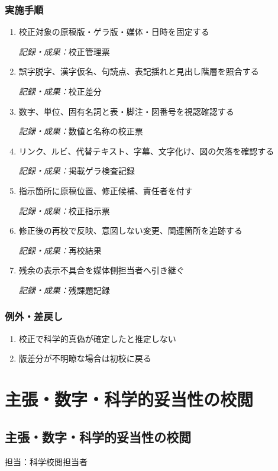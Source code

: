 \documentclass[a4paper,11pt]{article}
\begin{document}
\subsubsection*{実施手順}
\begin{enumerate}[leftmargin=2em,itemsep=0.65em]
\item 校正対象の原稿版・ゲラ版・媒体・日時を固定する\par\noindent\textit{記録・成果：}校正管理票\nobreak\smallskip
\item 誤字脱字、漢字仮名、句読点、表記揺れと見出し階層を照合する\par\noindent\textit{記録・成果：}校正差分\nobreak\smallskip
\item 数字、単位、固有名詞と表・脚注・図番号を視認確認する\par\noindent\textit{記録・成果：}数値と名称の校正票\nobreak\smallskip
\item リンク、ルビ、代替テキスト、字幕、文字化け、図の欠落を確認する\par\noindent\textit{記録・成果：}掲載ゲラ検査記録\nobreak\smallskip
\item 指示箇所に原稿位置、修正候補、責任者を付す\par\noindent\textit{記録・成果：}校正指示票\nobreak\smallskip
\item 修正後の再校で反映、意図しない変更、関連箇所を追跡する\par\noindent\textit{記録・成果：}再校結果\nobreak\smallskip
\item 残余の表示不具合を媒体側担当者へ引き継ぐ\par\noindent\textit{記録・成果：}残課題記録\nobreak\smallskip
\end{enumerate}
\subsubsection*{例外・差戻し}
\begin{enumerate}[leftmargin=2em,itemsep=0.35em]
\item 校正で科学的真偽が確定したと推定しない
\item 版差分が不明瞭な場合は初校に戻る
\end{enumerate}
\section{主張・数字・科学的妥当性の校閲}
\subsection{主張・数字・科学的妥当性の校閲}
\par 担当：科学校閲担当者\par\medskip
\end{document}
